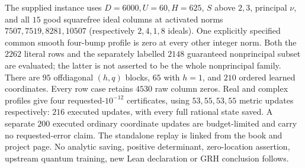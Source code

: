 The supplied instance uses $D=6000,U=60,H=625$, $S$ above $2,3$, principal
$\nu$, and all $15$ good squarefree ideal columns at activated norms
$7507,7519,8281,10507$ (respectively $2,4,1,8$ ideals).
One explicitly specified common smooth four-bump profile is zero at every
other integer norm. Both the $2262$ literal rows and the separately labelled
$2148$ guaranteed nonprincipal subset are evaluated; the latter is not
asserted to be the whole nonprincipal family.
There are $95$ offdiagonal $(h,q)$ blocks, $65$ with $h=1$, and $210$
ordered learned coordinates. Every row case retains $4530$ raw column zeros.
Real and complex profiles give four requested-$10^{-12}$ certificates,
using $53,55,53,55$ metric updates respectively: $216$ executed updates,
with every full rational state saved. A separate $200$ executed ordinary
coordinate updates are budget-limited and carry no requested-error claim.
The standalone replay is linked from the book and project page.
No analytic saving, positive determinant, zero-location assertion,
upstream quantum training, new Lean declaration or GRH conclusion follows.

